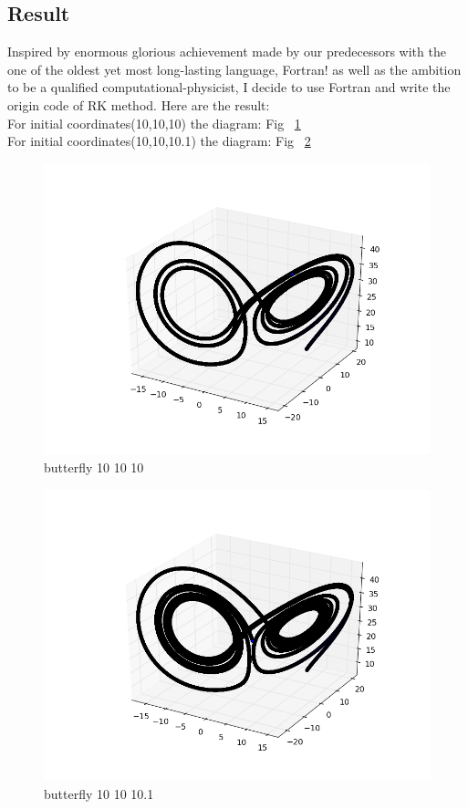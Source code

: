 \documentclass[11pt,letterpaper]{article}
\begin{document}
\subsection{Result}
Inspired by enormous glorious achievement made by our predecessors with the one of the oldest yet most long-lasting language, Fortran! as well as the ambition to be a qualified computational-physicist, I decide to use Fortran and write the origin code of RK method. Here are the result:\\
For initial coordinates(10,10,10) the diagram: Fig ~\ref{figure2} \\
For initial coordinates(10,10,10.1) the diagram: Fig ~\ref{figure3} \\

\begin{figure}
\begin{center}
\includegraphics[width=0.8\linewidth,angle=0]{butterfly.png}
\caption{butterfly 10 10 10}
\label{figure2}
\end{center}
\end{figure}

\begin{figure}
\begin{center}
\includegraphics[width=0.8\linewidth,angle=0]{butterfly1.png}
\caption{butterfly 10 10 10.1}
\label{figure3}
\end{center}
\end{figure}
\end{document}
